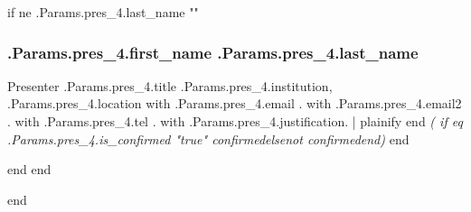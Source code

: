 \documentclass{report}
\begin{document}
              {{ if ne .Params.pres_4.last_name "" }}
                \subsubsection*{ {{.Params.pres_4.first_name}} {{.Params.pres_4.last_name}} }
                Presenter\newline
                {{.Params.pres_4.title}}\newline
                {{.Params.pres_4.institution}}, {{.Params.pres_4.location}}
                \newline
                {{ with .Params.pres_4.email }}{{.}}
                {{ with .Params.pres_4.email2 }}{{.}}
                {{ with .Params.pres_4.tel }}{{.}}
                \newline
                \newline
                {{ with .Params.pres_4.justification}}{{. | plainify }}{{ end }}
                \emph{ ({{ if eq .Params.pres_4.is_confirmed "true" }}confirmed{{else}}not confirmed{{end}}) }
              {{ end }}











    {{ end }}
  {{ end }}

  {{ end }}
\end{document}

